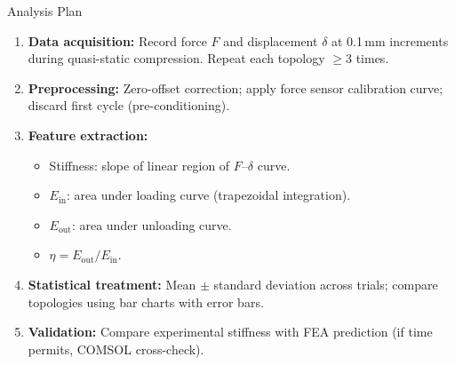 \begin{frame}{Analysis Plan}
  \small
  \begin{enumerate}
    \item \textbf{Data acquisition:}
          Record force $F$ and displacement $\delta$ at 0.1\,mm
          increments during quasi-static compression.
          Repeat each topology $\ge 3$ times.
    \item \textbf{Preprocessing:}
          Zero-offset correction; apply force sensor calibration
          curve; discard first cycle (pre-conditioning).
    \item \textbf{Feature extraction:}
          \begin{itemize}
            \item Stiffness: slope of linear region of $F$--$\delta$ curve.
            \item $E_{\text{in}}$: area under loading curve (trapezoidal integration).
            \item $E_{\text{out}}$: area under unloading curve.
            \item $\eta = E_{\text{out}}/E_{\text{in}}$.
          \end{itemize}
    \item \textbf{Statistical treatment:}
          Mean $\pm$ standard deviation across trials;
          compare topologies using bar charts with error bars.
    \item \textbf{Validation:}
          Compare experimental stiffness with FEA prediction
          (if time permits, COMSOL cross-check).
  \end{enumerate}
\end{frame}

